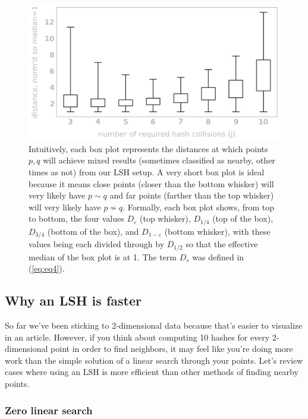 \documentclass[20pt,]{extarticle}
\begin{document}
\begin{figure}
\centering
\includegraphics{images/image9@2x.png}
\caption{Intuitively, each box plot represents the distances at which
points \(p, q\) will achieve mixed results (sometimes classified as
nearby, other times as not) from our LSH setup. A very short box plot is
ideal because it means close points (closer than the bottom whisker)
will very likely have \(p\sim q\) and far points (farther than the top
whisker) will very likely have \(p\not\sim q.\) Formally, each box plot
shows, from top to bottom, the four values \(D_\varepsilon\) (top
whisker), \(D_{1/4}\) (top of the box), \(D_{3/4}\) (bottom of the box),
and \(D_{1 - \varepsilon}\) (bottom whisker), with these values being
each divided through by \(D_{1/2}\) so that the effective median of the
box plot is at 1. The term \(D_s\) was defined in
(\ref{eq:eq4}).}\label{fig:fig9}
\end{figure}

\subsection{Why an LSH is faster}\label{why-an-lsh-is-faster}

So far we've been sticking to 2-dimensional data because that's easier
to visualize in an article. However, if you think about computing 10
hashes for every 2-dimensional point in order to find neighbors, it may
feel like you're doing more work than the simple solution of a linear
search through your points. Let's review cases where using an LSH is
more efficient than other methods of finding nearby points.

\subsubsection{Zero linear search}\label{zero-linear-search}
\end{document}
